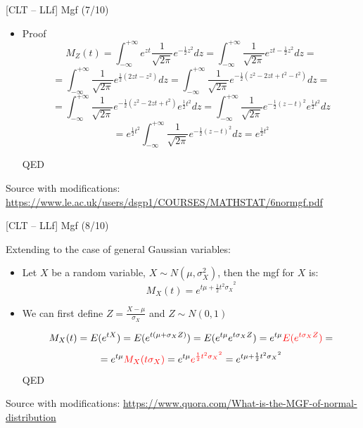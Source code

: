 \documentclass{beamer}
\begin{document}
\begin{frame}
{\centerline{[CLT -- LLf] Mgf (7/10)}}

\begin{itemize}
\item Proof
$$M_Z(t) = \int_{-\infty}^{+ \infty} e^{zt} \frac{1}{\sqrt{2\pi}}e^{-\frac{1}{2}z^2}dz = 
\int_{-\infty}^{+ \infty} \frac{1}{\sqrt{2\pi}} e^{zt-\frac{1}{2}z^2}dz =$$
$$ = \int_{-\infty}^{+ \infty} \frac{1}{\sqrt{2\pi}} e^{\frac{1}{2}(2zt-z^2)}dz = \int_{-\infty}^{+ \infty} \frac{1}{\sqrt{2\pi}} e^{-\frac{1}{2}(z^2 - 2zt +t^2 - t^2)}dz =$$
$$ = \int_{-\infty}^{+ \infty} \frac{1}{\sqrt{2\pi}} e^{-\frac{1}{2}(z^2 - 2zt +t^2 )}e^{\frac{1}{2}t^2}dz
= \int_{-\infty}^{+ \infty}\frac{1}{\sqrt{2\pi}} e^{-\frac{1}{2}(z - t )^2}e^{\frac{1}{2}t^2}dz$$
$$ =  e^{\frac{1}{2}t^2} \int_{-\infty}^{+ \infty}\frac{1}{\sqrt{2\pi}} e^{-\frac{1}{2}(z - t )^2}dz = e^{\frac{1}{2}t^2} $$

QED
\end{itemize}

\begin{center}
\tiny 
Source with modifications: \url{https://www.le.ac.uk/users/dsgp1/COURSES/MATHSTAT/6normgf.pdf}
\end{center}
\end{frame}


\begin{frame}
{\centerline{[CLT -- LLf] Mgf (8/10)}}
Extending to the case of general Gaussian variables:
\begin{itemize}
\item Let $X$ be a random variable, $  X \sim N(\mu,\sigma_X^2)  $, then the mgf for $X$ is:
$$M_X(t) = e^{t\mu + \frac{1}{2}{t^2\sigma_X}^2}$$

\item We can first define $Z = \frac{X - \mu}{ \sigma_X}$ and $  Z \sim N(0,1) $

$$M_X(t) = E(e^{tX}) = E(e^{t(\mu + \sigma_XZ)}) =  E(e^{t\mu} e^{t\sigma_XZ}) = e^{t\mu} \textcolor{red}{E(e^{t\sigma_XZ})} =$$
$$ = e^{t\mu} \textcolor{red}{M_X(t\sigma_X)} =  e^{t\mu} \textcolor{red}{e^{\frac{1}{2}{t^2\sigma_X}^2}}= e^{t\mu + \frac{1}{2}{t^2\sigma_X}^2}$$
QED
\end{itemize}

\begin{center}
\tiny 
Source with modifications: \url{https://www.quora.com/What-is-the-MGF-of-normal-distribution}
\end{center}
\end{frame}
\end{document}
